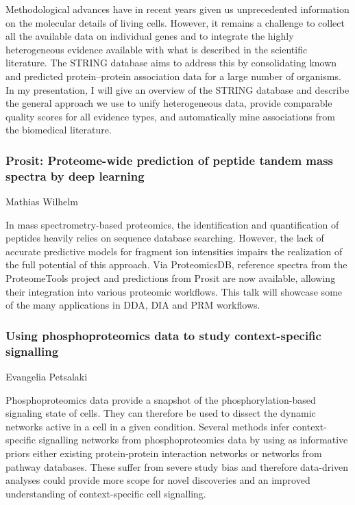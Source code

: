 Methodological advances have in recent years given us unprecedented information
on the molecular details of living cells. However, it remains a challenge to
collect all the available data on individual genes and to integrate the highly
heterogeneous evidence available with what is described in the scientific
literature. The STRING database aims to address this by consolidating known and
predicted protein–protein association data for a large number of organisms. In
my presentation, I will give an overview of the STRING database and describe
the general approach we use to unify heterogeneous data, provide comparable
quality scores for all evidence types, and automatically mine associations from
the biomedical literature.

\subsubsection*{\color{eubicRed} Prosit: Proteome-wide prediction of peptide tandem mass spectra by deep learning}
{\color{eubicGray}Mathias Wilhelm}

In mass spectrometry-based proteomics, the identification and quantification of
peptides heavily relies on sequence database searching. However, the lack of
accurate predictive models for fragment ion intensities impairs the realization
of the full potential of this approach. Via ProteomicsDB, reference spectra
from the ProteomeTools project and predictions from Prosit are now available,
allowing their integration into various proteomic workflows. This talk will
showcase some of the many applications in DDA, DIA and PRM workflows.

\subsubsection*{\color{eubicRed} Using phosphoproteomics data to study context-specific signalling}
{\color{eubicGray}Evangelia Petsalaki}

Phosphoproteomics data provide a snapshot of the phosphorylation-based
signaling state of cells.  They can therefore be used to dissect the dynamic
networks active in a cell in a given condition. Several methods infer
context-specific signalling networks from phosphoproteomics data by using as
informative priors either existing protein-protein interaction networks or
networks from pathway databases. These suffer from severe study bias and
therefore data-driven analyses could provide more scope for novel discoveries
and an improved understanding of context-specific cell signalling.

